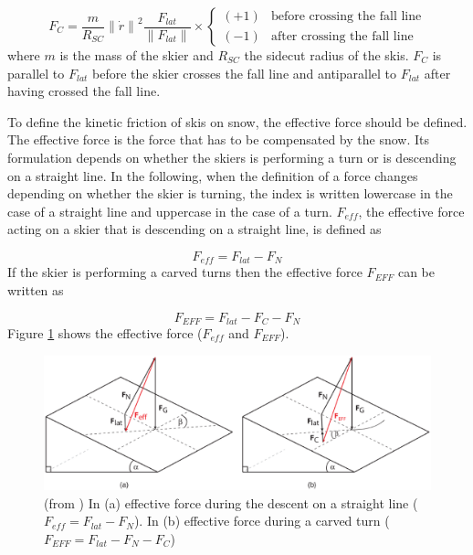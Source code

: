 \documentclass[12pt,a4paper,twoside]{book}
\newcommand{\norm}[1]{\lVert#1\rVert}
\begin{document}
\begin{equation}
F_C=\frac{m}{R_{SC}} {\norm{\dot{r}}}^2 \frac{F_{lat}}{\norm{F_{lat}}} \times
\begin{cases}
  (+1) & \text{before crossing the fall line} \\
  (-1) & \text{after crossing the fall line}
  \end{cases}
\end{equation}
where $m$ is the mass of the skier and $R_{SC}$ the sidecut radius of the skis. $F_C$ is parallel to $F_{lat}$ before the skier crosses the fall line and antiparallel to $F_{lat}$ after having crossed the fall line.

To define the kinetic friction of skis on snow, the effective force should be defined. The effective force is the force that has to be compensated by the snow. Its formulation depends on whether the skiers is performing a turn or is descending on a straight line. In the following, when the definition of a force changes depending on whether the skier is turning, the index is written lowercase in the case of a straight line and uppercase in the case of a turn. $F_{eff}$, the effective force acting on a skier that is descending on a straight line, is defined as

\begin{equation}
F_{eff}=F_{lat}-F_N
\end{equation}
If the skier is performing a carved turns then the effective force $F_{EFF}$ can be written as

\begin{equation}
F_{EFF}=F_{lat}-F_C-F_N
\end{equation}
Figure \ref{effective_force_pic} shows the effective force ($F_{eff}$ and $F_{EFF}$).

\begin{figure}[!ht]
  \begin{center}
    \includegraphics[width=\textwidth]{images/figure6.eps}
    \caption{(from \cite{hol2012}) In (a) effective force during the descent on a straight line ($F_{eff}=F_{lat}-F_N$). In (b) effective force during a carved turn ($F_{EFF}=F_{lat}-F_N-F_C$)}\label{effective_force_pic}
  \end{center}
\end{figure}
\end{document}
